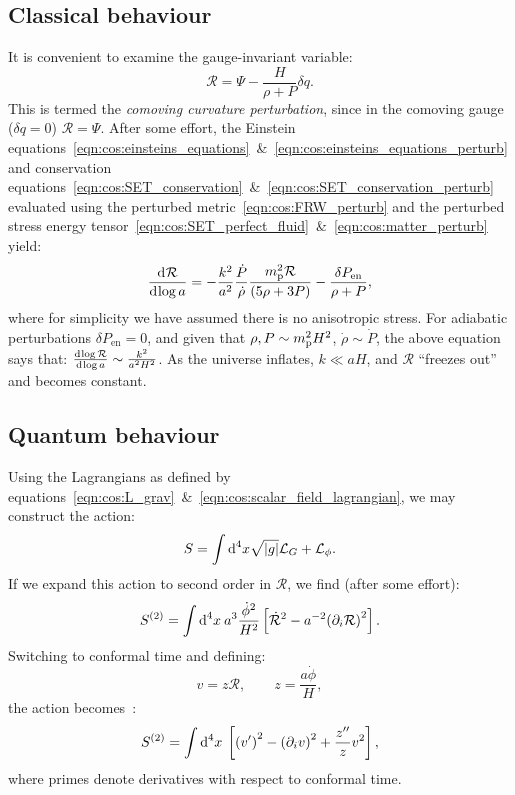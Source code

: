 \subsection{Classical behaviour}
\label{sec:cos:freeze_out}
It is convenient to examine the gauge-invariant variable:
\begin{equation}
  \mathcal{R} = \Psi - \frac{H}{\rho+P}\delta q.
  \label{eqn:cos:CCP}
\end{equation}
This is termed the {\em comoving curvature perturbation}, since in the comoving gauge (\(\delta q=0\)) \(\mathcal{R}=\Psi\).
After some effort, the Einstein equations~\eqref{eqn:cos:einsteins_equations}~\&~\eqref{eqn:cos:einsteins_equations_perturb} and conservation equations~\eqref{eqn:cos:SET_conservation}~\&~\eqref{eqn:cos:SET_conservation_perturb} evaluated using the perturbed metric~\eqref{eqn:cos:FRW_perturb} and the perturbed stress energy tensor~\eqref{eqn:cos:SET_perfect_fluid}~\&~\eqref{eqn:cos:matter_perturb} yield:
\begin{equation}
  \frac{\d{\mathcal{R}}}{\d{\log a}} = 
  -\frac{k^2}{a^2}\frac{\dot{P}}{\dot{\rho}}\frac{\m^2\mathcal{R}}{(5\rho + 3P)}
  -\frac{\delta P_\mathrm{en}}{\rho+P},
\end{equation}
where for simplicity we have assumed there is no anisotropic stress. For adiabatic perturbations \(\delta P_\mathrm{en}=0\), and given that \(\rho,P\sim \m^2 H^2\), \(\dot{\rho}\sim\dot{P}\), the above equation says that: \(\frac{\d{\log \mathcal{R}}}{\d{\log a}} \sim \frac{k^2}{a^2H^2}\). As the universe inflates, \(k\ll aH\), and \(\mathcal{R}\) ``freezes out'' and becomes constant.

\subsection{Quantum behaviour}
Using the Lagrangians as defined by equations~\eqref{eqn:cos:L_grav}~\&~\eqref{eqn:cos:scalar_field_lagrangian}, we may construct the action:
\begin{equation}
  S = \int \d[4]{x}\sqrt{|g|}\mathcal{L}_G + \mathcal{L}_\phi.
\end{equation}
If we expand this action to second order in \(\mathcal{R}\), we find (after some effort):
\begin{equation}
  S^{(2)} = \int \d[4]{x}\: a^3 \frac{\dot{\phi}^2}{H^2}\left[ \mathcal{\dot{R}}^2 -a^{-2}{\left( \partial_i\mathcal{R} \right)}^2 \right].
\end{equation}
Switching to conformal time and defining:
\begin{equation}
  v = z \mathcal{R}, \qquad
  z = \frac{a \dot{\phi}}{H},
\end{equation}
the action becomes~\citep[App B]{Baumann+2009}:
\begin{equation}
  S^{(2)} = \int \d[4]{x}\: \left[ {\left( v^{\prime} \right)}^2 - {\left( \partial_i v \right)}^2 + \frac{z^{\prime\prime}}{z}v^2\right],
\end{equation}
where primes denote derivatives with respect to conformal time.

